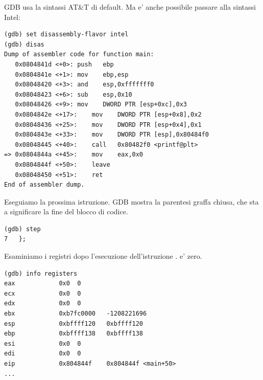 \ac{GDB} usa la sintassi AT\&T di default.
Ma e' anche possibile passare alla sintassi Intel:

\begin{lstlisting}
(gdb) set disassembly-flavor intel
(gdb) disas
Dump of assembler code for function main:
   0x0804841d <+0>:	push   ebp
   0x0804841e <+1>:	mov    ebp,esp
   0x08048420 <+3>:	and    esp,0xfffffff0
   0x08048423 <+6>:	sub    esp,0x10
   0x08048426 <+9>:	mov    DWORD PTR [esp+0xc],0x3
   0x0804842e <+17>:	mov    DWORD PTR [esp+0x8],0x2
   0x08048436 <+25>:	mov    DWORD PTR [esp+0x4],0x1
   0x0804843e <+33>:	mov    DWORD PTR [esp],0x80484f0
   0x08048445 <+40>:	call   0x80482f0 <printf@plt>
=> 0x0804844a <+45>:	mov    eax,0x0
   0x0804844f <+50>:	leave  
   0x08048450 <+51>:	ret    
End of assembler dump.
\end{lstlisting}

Eseguiamo la prossima istruzione.
\ac{GDB} mostra la parentesi graffa chiusa, che sta a significare la fine del blocco di codice.

\begin{lstlisting}
(gdb) step
7	};
\end{lstlisting}

Esaminiamo i registri dopo l'esecuzione dell'istruzione .
\EAX e' zero.

\begin{lstlisting}
(gdb) info registers
eax            0x0	0
ecx            0x0	0
edx            0x0	0
ebx            0xb7fc0000	-1208221696
esp            0xbffff120	0xbffff120
ebp            0xbffff138	0xbffff138
esi            0x0	0
edi            0x0	0
eip            0x804844f	0x804844f <main+50>
...
\end{lstlisting}
\fi
\fi
